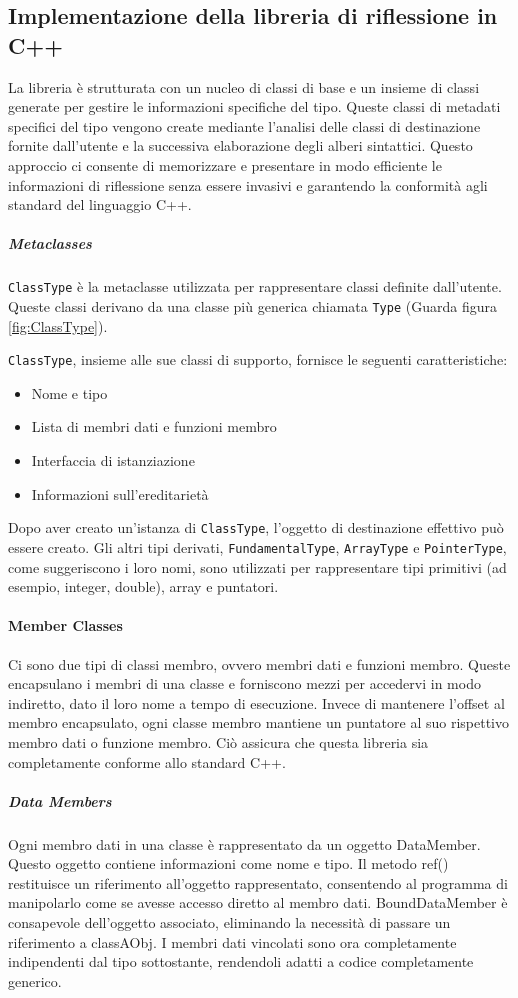 \documentclass[11pt]{article}
\begin{document}
\begin{multicols*}{2}[\columnsep=1cm]
    \subsection{Implementazione della libreria di riflessione in C++}
    La libreria è strutturata con un nucleo di classi di base e un insieme di classi generate per gestire le informazioni specifiche del tipo. Queste classi di metadati specifici del tipo vengono create mediante l'analisi delle classi di destinazione fornite dall'utente e la successiva elaborazione degli alberi sintattici. Questo approccio ci consente di memorizzare e presentare in modo efficiente le informazioni di riflessione senza essere invasivi e garantendo la conformità agli standard del linguaggio C++.
    \subparagraph*{Metaclasses}
    \texttt{ClassType} è la metaclasse utilizzata per rappresentare classi definite dall'utente. 
    Queste classi derivano da una classe più generica chiamata \texttt{Type} (Guarda figura \ref*{fig:ClassType}).
    
    \texttt{ClassType}, insieme alle sue classi di supporto, fornisce le seguenti caratteristiche:
        \begin{itemize}
            \item Nome e tipo
            \item Lista di membri dati e funzioni membro
            \item Interfaccia di istanziazione
            \item Informazioni sull'ereditarietà
        \end{itemize}
    Dopo aver creato un'istanza di \texttt{ClassType}, l'oggetto di destinazione effettivo può essere creato.
    Gli altri tipi derivati, \texttt{FundamentalType}, \texttt{ArrayType} e \texttt{PointerType}, come suggeriscono i loro nomi, sono utilizzati per rappresentare tipi primitivi (ad esempio, integer, double), array e puntatori.

    \paragraph{Member Classes}
    Ci sono due tipi di classi membro, ovvero membri dati e funzioni membro. Queste encapsulano i membri di una classe e forniscono mezzi per accedervi in modo indiretto, dato il loro nome a tempo di esecuzione. Invece di mantenere l'offset al membro encapsulato, ogni classe membro mantiene un puntatore al suo rispettivo membro dati o funzione membro. Ciò assicura che questa libreria sia completamente conforme allo standard C++.
    \subparagraph*{Data Members}
    Ogni membro dati in una classe è rappresentato da un oggetto DataMember. Questo oggetto contiene informazioni come nome e tipo.
    Il metodo ref() restituisce un riferimento all'oggetto rappresentato, consentendo al programma di manipolarlo come se avesse accesso diretto al membro dati.
    BoundDataMember è consapevole dell'oggetto associato, eliminando la necessità di passare un riferimento a classAObj. I membri dati vincolati sono ora completamente indipendenti dal tipo sottostante, rendendoli adatti a codice completamente generico.


\end{multicols*}
\end{document}
